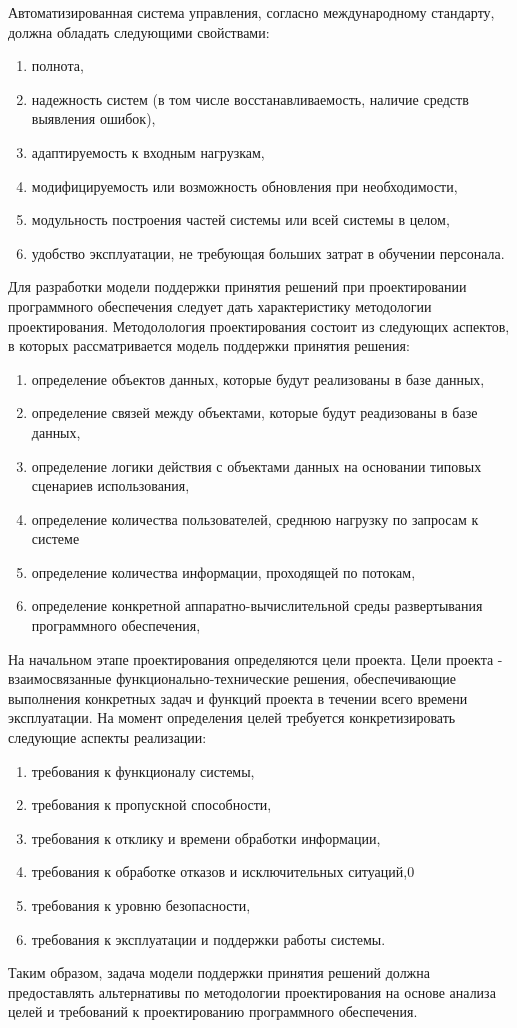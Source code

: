 Автоматизированная система управления, согласно международному стандарту\cite{ACSSt}, должна обладать следующими свойствами:
\begin{enumerate}
    \item  полнота,
    \item  надежность систем (в том числе восстанавливаемость, наличие средств выявления ошибок),
    \item  адаптируемость к входным нагрузкам,
    \item  модифицируемость или возможность обновления при необходимости,
    \item  модульность построения частей системы или всей системы в целом, 
    \item  удобство эксплуатации, не требующая больших затрат в обучении персонала.
\end{enumerate}  

Для разработки модели поддержки принятия решений при проектировании программного обеспечения следует дать характеристику методологии проектирования. Методолология проектирования состоит из следующих аспектов, в которых рассматривается модель поддержки принятия решения:
\begin{enumerate}
    \item  определение объектов данных, которые будут реализованы в базе данных,
    \item  определение связей между объектами, которые будут реадизованы в базе данных,
    \item  определение логики действия с объектами данных на основании типовых сценариев использования,
    \item  определение количества пользователей, среднюю нагрузку по запросам к системе
    \item  определение количества информации, проходящей по потокам,
    \item  определение конкретной аппаратно-вычислительной среды развертывания программного обеспечения,
\end{enumerate}
На начальном этапе проектирования определяются цели проекта. Цели проекта - взаимосвязанные функционально-технические решения, обеспечивающие выполнения конкретных задач и функций проекта в течении всего времени эксплуатации. На момент определения целей требуется конкретизировать следующие аспекты реализации:
\begin{enumerate}
    \item  требования к функционалу системы,
    \item  требования к пропускной способности,
    \item  требования к отклику и времени обработки информации,
    \item  требования к обработке отказов и исключительных ситуаций,0
    \item  требования к уровню безопасности,
    \item  требования к эксплуатации и поддержки работы системы.
\end{enumerate} 
Таким образом, задача модели поддержки принятия решений должна предоставлять альтернативы по методологии проектирования на основе анализа целей и требований к проектированию программного обеспечения.

